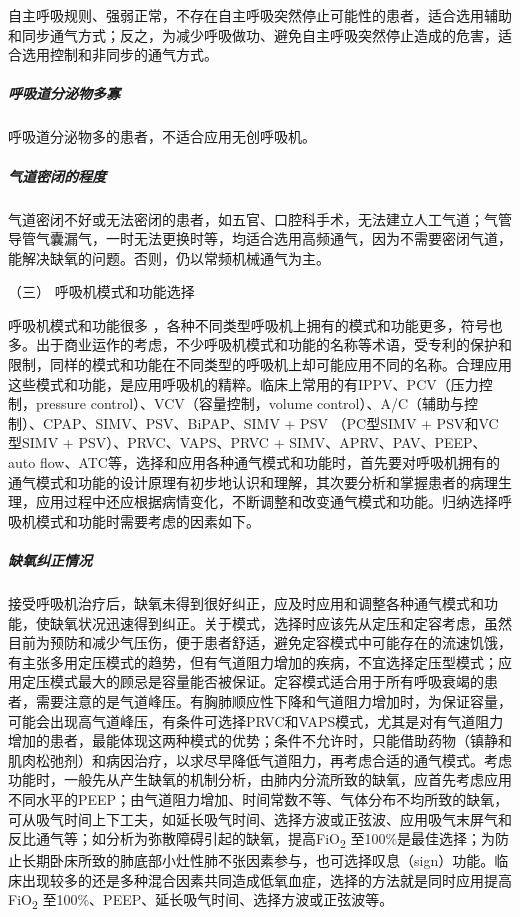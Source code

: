 自主呼吸规则、强弱正常，不存在自主呼吸突然停止可能性的患者，适合选用辅助和同步通气方式；反之，为减少呼吸做功、避免自主呼吸突然停止造成的危害，适合选用控制和非同步的通气方式。

\subparagraph{呼吸道分泌物多寡}

呼吸道分泌物多的患者，不适合应用无创呼吸机。

\subparagraph{气道密闭的程度}

气道密闭不好或无法密闭的患者，如五官、口腔科手术，无法建立人工气道；气管导管气囊漏气，一时无法更换时等，均适合选用高频通气，因为不需要密闭气道，能解决缺氧的问题。否则，仍以常频机械通气为主。

\hypertarget{text00368.htmlux5cux23CHP16-3-2-3-3}{}
（三） 呼吸机模式和功能选择

呼吸机模式和功能很多
，各种不同类型呼吸机上拥有的模式和功能更多，符号也多。出于商业运作的考虑，不少呼吸机模式和功能的名称等术语，受专利的保护和限制，同样的模式和功能在不同类型的呼吸机上却可能应用不同的名称。合理应用这些模式和功能，是应用呼吸机的精粹。临床上常用的有IPPV、PCV（压力控制，pressure
control）、VCV（容量控制，volume
control）、A/C（辅助与控制）、CPAP、SIMV、PSV、BiPAP、SIMV + PSV
（PC型SIMV + PSV和VC型SIMV + PSV）、PRVC、VAPS、PRVC +
SIMV、APRV、PAV、PEEP、auto
flow、ATC等，选择和应用各种通气模式和功能时，首先要对呼吸机拥有的通气模式和功能的设计原理有初步地认识和理解，其次要分析和掌握患者的病理生理，应用过程中还应根据病情变化，不断调整和改变通气模式和功能。归纳选择呼吸机模式和功能时需要考虑的因素如下。

\subparagraph{缺氧纠正情况}

接受呼吸机治疗后，缺氧未得到很好纠正，应及时应用和调整各种通气模式和功能，使缺氧状况迅速得到纠正。关于模式，选择时应该先从定压和定容考虑，虽然目前为预防和减少气压伤，便于患者舒适，避免定容模式中可能存在的流速饥饿，有主张多用定压模式的趋势，但有气道阻力增加的疾病，不宜选择定压型模式；应用定压模式最大的顾忌是容量能否被保证。定容模式适合用于所有呼吸衰竭的患者，需要注意的是气道峰压。有胸肺顺应性下降和气道阻力增加时，为保证容量，可能会出现高气道峰压，有条件可选择PRVC和VAPS模式，尤其是对有气道阻力增加的患者，最能体现这两种模式的优势；条件不允许时，只能借助药物（镇静和肌肉松弛剂）和病因治疗，以求尽早降低气道阻力，再考虑合适的通气模式。考虑功能时，一般先从产生缺氧的机制分析，由肺内分流所致的缺氧，应首先考虑应用不同水平的PEEP；由气道阻力增加、时间常数不等、气体分布不均所致的缺氧，可从吸气时间上下工夫，如延长吸气时间、选择方波或正弦波、应用吸气末屏气和反比通气等；如分析为弥散障碍引起的缺氧，提高FiO\textsubscript{2}
至100\%是最佳选择；为防止长期卧床所致的肺底部小灶性肺不张因素参与，也可选择叹息（sign）功能。临床出现较多的还是多种混合因素共同造成低氧血症，选择的方法就是同时应用提高FiO\textsubscript{2}
至100\%、PEEP、延长吸气时间、选择方波或正弦波等。

